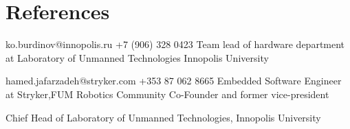 \section{References}
    {ko.burdinov@innopolis.ru
    \hspace{7mm} +7 (906) 328 0423 }
    {Team lead of hardware department at Laboratory of Unmanned Technologies
    Innopolis University
    }

    {hamed.jafarzadeh@stryker.com 
    \hspace{7mm} +353 87 062 8665}
    {Embedded Software Engineer at Stryker,FUM Robotics Community Co-Founder and former vice-president }

    
    {Chief Head of Laboratory of Unmanned Technologies,
    Innopolis University
    }